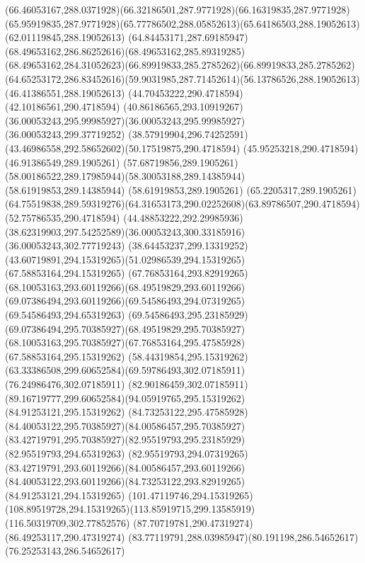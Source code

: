 {{	\curveto(66.46053167,288.0371928)(66.32186501,287.9771928)(66.16319835,287.9771928)
	\curveto(65.95919835,287.9771928)(65.77786502,288.05852613)(65.64186503,288.19052613)
	\lineto(62.01119845,288.19052613)
	\curveto(64.84453171,287.69185947)(68.49653162,286.86252616)(68.49653162,285.89319285)
	\curveto(68.49653162,284.31052623)(66.89919833,285.2785262)(66.89919833,285.2785262)
	\curveto(64.65253172,286.83452616)(59.9031985,287.71452614)(56.13786526,288.19052613)
	\lineto(46.41386551,288.19052613)
	\lineto(44.70453222,290.4718594)
	\lineto(42.10186561,290.4718594)
	\curveto(40.86186565,293.10919267)(36.00053243,295.99985927)(36.00053243,295.99985927)
	\lineto(36.00053243,299.37719252)
	\curveto(38.57919904,296.74252591)(43.46986558,292.58652602)(50.17519875,290.4718594)
	\lineto(45.95253218,290.4718594)
	\lineto(46.91386549,289.1905261)
	\lineto(57.68719856,289.1905261)
	\curveto(58.00186522,289.17985944)(58.30053188,289.14385944)(58.61919853,289.14385944)
	\lineto(58.61919853,289.1905261)
	\lineto(65.2205317,289.1905261)
	\curveto(64.75519838,289.59319276)(64.31653173,290.02252608)(63.89786507,290.4718594)
	\lineto(52.75786535,290.4718594)
	\curveto(44.48853222,292.29985936)(38.62319903,297.54252589)(36.00053243,300.33185916)
	\lineto(36.00053243,302.77719243)
	\curveto(38.64453237,299.13319252)(43.60719891,294.15319265)(51.02986539,294.15319265)
	\lineto(67.58853164,294.15319265)
	\curveto(67.76853164,293.82919265)(68.10053163,293.60119266)(68.49519829,293.60119266)
	\curveto(69.07386494,293.60119266)(69.54586493,294.07319265)(69.54586493,294.65319263)
	\curveto(69.54586493,295.23185929)(69.07386494,295.70385927)(68.49519829,295.70385927)
	\curveto(68.10053163,295.70385927)(67.76853164,295.47585928)(67.58853164,295.15319262)
	\lineto(58.44319854,295.15319262)
	\curveto(63.33386508,299.60652584)(69.59786493,302.07185911)(76.24986476,302.07185911)
	\curveto(82.90186459,302.07185911)(89.16719777,299.60652584)(94.05919765,295.15319262)
	\lineto(84.91253121,295.15319262)
	\curveto(84.73253122,295.47585928)(84.40053122,295.70385927)(84.00586457,295.70385927)
	\curveto(83.42719791,295.70385927)(82.95519793,295.23185929)(82.95519793,294.65319263)
	\curveto(82.95519793,294.07319265)(83.42719791,293.60119266)(84.00586457,293.60119266)
	\curveto(84.40053122,293.60119266)(84.73253122,293.82919265)(84.91253121,294.15319265)
	\lineto(101.47119746,294.15319265)
	\curveto(108.89519728,294.15319265)(113.85919715,299.13585919)(116.50319709,302.77852576)
	\moveto(87.70719781,290.47319274)
	\lineto(86.49253117,290.47319274)
	\curveto(83.77119791,288.03985947)(80.191198,286.54652617)(76.25253143,286.54652617)
}}

